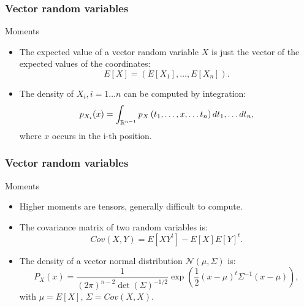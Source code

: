 \documentclass[main.tex]{subfiles}
\begin{document}
\begin{frame}
    \frametitle{Vector random variables}
\begin{block}{Moments}
    \begin{itemize}
        \item<+-> The expected value of a vector random variable $X$ is just
        the vector of the expected values of the coordinates:
        \begin{equation}
            E\left[ X \right] = \left( E\left[ X_1 \right], \dots, E\left[ X_n \right] \right).
        \end{equation} 
        \item<+-> The density of $X_i, i=1\dots n$ can be computed by integration:
        \begin{equation}
            p_{X_i}(x) = \int_{\mathbb{R}^{n-1}} p_X\left( t_1, \dots, x, \dots t_n \right) dt_1,\dots dt_n,
        \end{equation}
        where $x$ occurs in the i-th position.
    \end{itemize}
\end{block}
\end{frame}
\begin{frame}
    \frametitle{Vector random variables}
\begin{block}{Moments}
    \begin{itemize}
        \item<+-> Higher moments are tensors, generally difficult to compute.
        \item<+-> The covariance matrix of two random variables is:
        \begin{equation}
            Cov(X,Y) = E\left[ X Y^t \right] - E\left[ X \right]E\left[ Y \right]^t.
        \end{equation}
        \item<+-> The density of a vector normal distribution $\mathcal{N}\left( \mu, \Sigma \right)$ is:
        \begin{equation}
            P_X(x) = \frac{1}{(2\pi)^{n-2}\det(\Sigma)^{-1/2}} 
            \exp \left( \frac{1}{2} (x-\mu)^t \Sigma^{-1} (x-\mu)\right),
        \end{equation}
        with $\mu = E\left[ X \right], \, \Sigma= Cov(X,X).$
        \end{itemize}
\end{block}
\end{frame}
\end{document}
